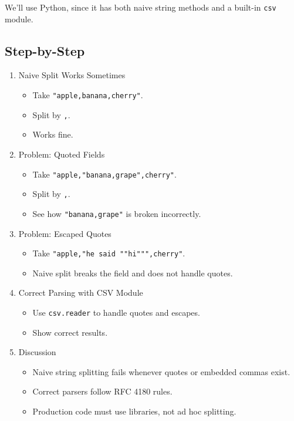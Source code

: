 \documentclass[
  letterpaper,
  DIV=11,
  numbers=noendperiod]{scrreprt}
\providecommand{\tightlist}{%
  \setlength{\itemsep}{0pt}\setlength{\parskip}{0pt}}
\begin{document}
We'll use Python, since it has both naive string methods and a built-in
\texttt{csv} module.

\subsection{Step-by-Step}\label{step-by-step-5}

\begin{enumerate}
\def\labelenumi{\arabic{enumi}.}
\item
  Naive Split Works Sometimes

  \begin{itemize}
  \tightlist
  \item
    Take \texttt{"apple,banana,cherry"}.
  \item
    Split by \texttt{,}.
  \item
    Works fine.
  \end{itemize}
\item
  Problem: Quoted Fields

  \begin{itemize}
  \tightlist
  \item
    Take \texttt{"apple,"banana,grape",cherry"}.
  \item
    Split by \texttt{,}.
  \item
    See how \texttt{"banana,grape"} is broken incorrectly.
  \end{itemize}
\item
  Problem: Escaped Quotes

  \begin{itemize}
  \tightlist
  \item
    Take \texttt{"apple,"he\ said\ ""hi""",cherry"}.
  \item
    Naive split breaks the field and does not handle quotes.
  \end{itemize}
\item
  Correct Parsing with CSV Module

  \begin{itemize}
  \tightlist
  \item
    Use \texttt{csv.reader} to handle quotes and escapes.
  \item
    Show correct results.
  \end{itemize}
\item
  Discussion

  \begin{itemize}
  \tightlist
  \item
    Naive string splitting fails whenever quotes or embedded commas
    exist.
  \item
    Correct parsers follow RFC 4180 rules.
  \item
    Production code must use libraries, not ad hoc splitting.
  \end{itemize}
\end{enumerate}
\end{document}
